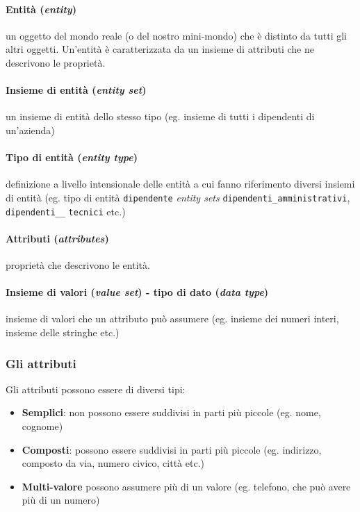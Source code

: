         \paragraph{Entità (\textit{entity})} un oggetto del mondo reale (o del nostro mini-mondo) che è distinto da tutti gli altri oggetti. Un'entità è caratterizzata da un insieme di attributi che ne descrivono le proprietà.
        \paragraph{Insieme di entità (\textit{entity set})} un insieme di entità dello stesso tipo (eg. insieme di tutti i dipendenti di un'azienda)
        \paragraph{Tipo di entità (\textit{entity type})} definizione a livello intensionale delle entità a cui fanno riferimento diversi insiemi di entità (eg. tipo di entità \texttt{dipendente} \textit{entity sets} \texttt{dipendenti\_amministrativi}, \texttt{dipendenti\_\_} \texttt{tecnici} etc.)
        \paragraph{Attributi (\textit{attributes})} proprietà che descrivono le entità.
        \paragraph{Insieme di valori (\textit{value set}) - tipo di dato (\textit{data type})} insieme di valori che un attributo può assumere (eg. insieme dei numeri interi, insieme delle stringhe etc.)
        \subsubsection{Gli attributi}
            Gli attributi possono essere di diversi tipi:
            \begin{itemize}
                \item \textbf{Semplici}: non possono essere suddivisi in parti più piccole (eg. nome, cognome)
                \item \textbf{Composti}: possono essere suddivisi in parti più piccole (eg. indirizzo, composto da via, numero civico, città etc.)
                \item \textbf{Multi-valore} possono assumere più di un valore (eg. telefono, che può avere più di un numero)
            \end{itemize}
